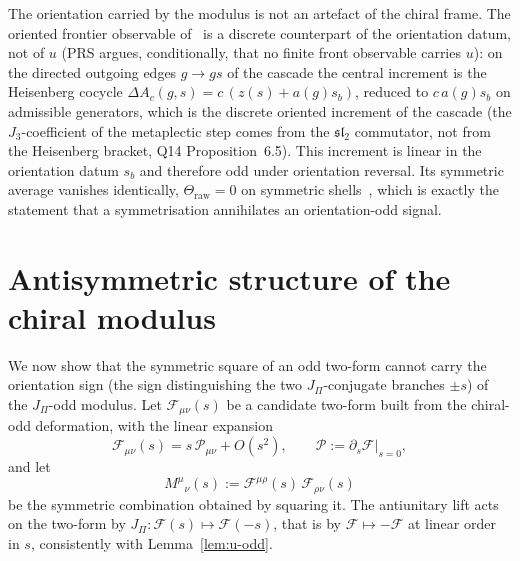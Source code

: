 \documentclass[11pt]{article}
\theoremstyle{definition}
\theoremstyle{remark}
\newcommand{\JPi}{J_{\Pi}}
\newcommand{\Jthree}{J_{3}}
\newcommand{\Fchi}{\mathcal{F}}
\newcommand{\Pchi}{\mathcal{P}}
\begin{document}
    The orientation carried by the modulus is not an artefact of the chiral frame.
    The oriented frontier observable of~\cite{Beau2026q11of} is a discrete counterpart of the orientation datum, not of
    $u$ (PRS argues, conditionally, that no finite front observable carries $u$): on the directed outgoing edges
    $g \to gs$ of the cascade the central increment is the Heisenberg cocycle
    $\Delta A_c(g, s) = c\,(z(s) + a(g) s_b)$, reduced to $c\,a(g) s_b$ on admissible generators, which is the discrete
    oriented
    increment of the cascade (the $\Jthree$-coefficient of the metaplectic step comes from the $\mathfrak{sl}_2$
    commutator, not from the Heisenberg bracket, Q14 Proposition~6.5).
    This increment is linear in the orientation datum $s_b$ and therefore odd under orientation reversal.
    Its symmetric average vanishes identically, $\Theta_{\mathrm{raw}} = 0$ on symmetric shells~\cite{Beau2026aar},
    which is exactly the statement that a symmetrisation annihilates an orientation-odd signal.

  \section{Antisymmetric structure of the chiral modulus}
    \label{sec:antisymmetry}

    We now show that the symmetric square of an odd two-form cannot carry the orientation sign (the sign distinguishing the two $\JPi$-conjugate branches $\pm s$) of the $\JPi$-odd modulus.
    Let $\Fchi_{\mu\nu}(s)$ be a candidate two-form built from the chiral-odd deformation, with the linear expansion
    \begin{equation}
      \label{eq:Fchi-linear}
      \Fchi_{\mu\nu}(s) = s\,\Pchi_{\mu\nu} + O(s^2), \qquad \Pchi := \partial_s \Fchi |_{s=0} ,
    \end{equation}
    and let
    \begin{equation}
      \label{eq:Mdef}
      M^{\mu}{}_{\nu}(s) := \Fchi^{\mu\rho}(s)\, \Fchi_{\rho\nu}(s)
    \end{equation}
    be the symmetric combination obtained by squaring it.
    The antiunitary lift acts on the two-form by $\JPi : \Fchi(s) \mapsto \Fchi(-s)$, that is by $\Fchi \mapsto -\Fchi$ at
    linear order in $s$, consistently with Lemma~\ref{lem:u-odd}.
\end{document}
